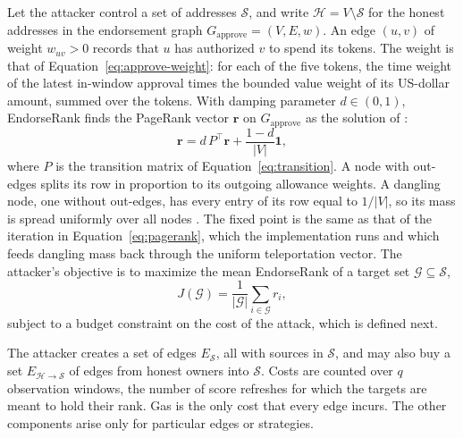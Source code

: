 
Let the attacker control a set of addresses $\mathcal{S}$, and write $\mathcal{H}=V\setminus\mathcal{S}$ for the honest addresses in the endorsement graph $G_{\text{approve}}=(V,E,w)$. An edge $(u,v)$ of weight $w_{uv}>0$ records that $u$ has authorized $v$ to spend its tokens. The weight is that of Equation~\eqref{eq:approve-weight}: for each of the five tokens, the time weight of the latest in-window approval times the bounded value weight of its US-dollar amount, summed over the tokens. With damping parameter $d\in(0,1)$, EndorseRank finds the PageRank vector $\mathbf{r}$ on $G_{\text{approve}}$ as the solution of \parencite{page1999pagerank}:
\begin{equation}
\label{eq:pagerank-sybil}
\mathbf{r} = d\, P^{\top} \mathbf{r} + \frac{1-d}{|V|}\mathbf{1},
\end{equation}
where $P$ is the transition matrix of Equation~\eqref{eq:transition}. A node with out-edges splits its row in proportion to its outgoing allowance weights. A dangling node, one without out-edges, has every entry of its row equal to $1/|V|$, so its mass is spread uniformly over all nodes \parencite{langville2006pagerank}. The fixed point is the same as that of the iteration in Equation~\eqref{eq:pagerank}, which the implementation runs and which feeds dangling mass back through the uniform teleportation vector. The attacker's objective is to maximize the mean EndorseRank of a target set $\mathcal{G}\subseteq\mathcal{S}$,
\begin{equation}
\label{eq:objective}
J(\mathcal{G}) = \frac{1}{|\mathcal{G}|}\sum_{i\in\mathcal{G}} r_i,
\end{equation}
subject to a budget constraint on the cost of the attack, which is defined next.


The attacker creates a set of edges $E_{\mathcal{S}}$, all with sources in $\mathcal{S}$, and may also buy a set $E_{\mathcal{H}\to\mathcal{S}}$ of edges from honest owners into $\mathcal{S}$. Costs are counted over $q$ observation windows, the number of score refreshes for which the targets are meant to hold their rank. Gas is the only cost that every edge incurs. The other components arise only for particular edges or strategies.

